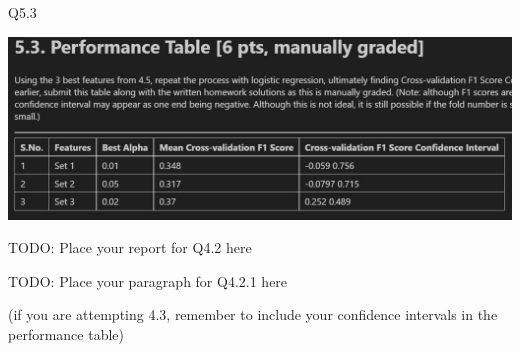\documentclass[12pt]{article}
\begin{document}
\vspace{4mm}
\noindent
Q5.3

\includegraphics[scale = 0.5]{5.3.jpg}

\vspace{4mm}
\noindent
TODO: Place your report for Q4.2 here 

\vspace{4mm}
\noindent
TODO: Place your paragraph for Q4.2.1 here 

\vspace{4mm}
\noindent
(if you are attempting 4.3, remember to include your confidence intervals in the performance table)
\end{document}
